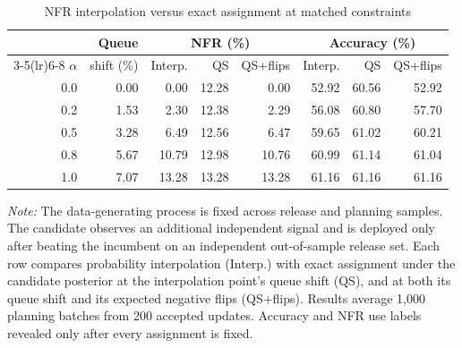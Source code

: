 \begin{table}[H]
\centering
\caption{NFR interpolation versus exact assignment at matched constraints}
\label{tab:stable-update}
\small
\begin{tabular}{rrrrrrrr}
\toprule
 & Queue & \multicolumn{3}{c}{NFR (\%)} & \multicolumn{3}{c}{Accuracy (\%)} \\
\cmidrule(lr){3-5}\cmidrule(lr){6-8}
$\alpha$ & shift (\%) & Interp. & QS & QS+flips & Interp. & QS & QS+flips \\
\midrule
0.0 & 0.00 & 0.00 & 12.28 & 0.00 & 52.92 & 60.56 & 52.92 \\
0.2 & 1.53 & 2.30 & 12.38 & 2.29 & 56.08 & 60.80 & 57.70 \\
0.5 & 3.28 & 6.49 & 12.56 & 6.47 & 59.65 & 61.02 & 60.21 \\
0.8 & 5.67 & 10.79 & 12.98 & 10.76 & 60.99 & 61.14 & 61.04 \\
1.0 & 7.07 & 13.28 & 13.28 & 13.28 & 61.16 & 61.16 & 61.16 \\
\bottomrule
\end{tabular}
\begin{minipage}{0.94\linewidth}
\footnotesize\emph{Note:} The data-generating process is fixed across release and planning samples. The candidate observes an additional independent signal and is deployed only after beating the incumbent on an independent out-of-sample release set. Each row compares probability interpolation (Interp.) with exact assignment under the candidate posterior at the interpolation point's queue shift (QS), and at both its queue shift and its expected negative flips (QS+flips). Results average 1,000 planning batches from 200 accepted updates. Accuracy and NFR use labels revealed only after every assignment is fixed.
\end{minipage}
\end{table}
